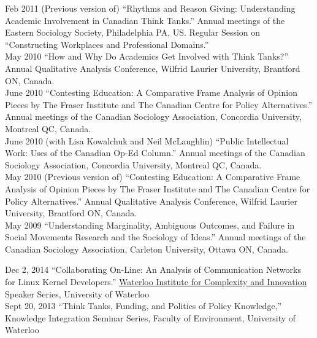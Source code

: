 \documentclass[9pt,usenames,dvipsnames]{article}
\begin{document}
\ind Feb 2011 (Previous version of) ``Rhythms and Reason Giving: Understanding Academic Involvement in Canadian Think Tanks.'' Annual meetings of the Eastern Sociology Society, Philadelphia PA, US. Regular Session on ``Constructing Workplaces and Professional Domains.''\\

\ind May 2010 ``How and Why Do Academics Get Involved with Think Tanks?'' Annual Qualitative Analysis Conference, Wilfrid Laurier University, Brantford ON, Canada.\\

\ind June 2010 ``Contesting Education: A Comparative Frame Analysis of Opinion Pieces by The Fraser Institute and The Canadian Centre for Policy Alternatives.'' Annual meetings  of the Canadian Sociology Association, Concordia University, Montreal QC, Canada.\\

\ind June 2010 (with Lisa Kowalchuk and Neil McLaughlin) ``Public Intellectual Work: Uses of the Canadian Op-Ed Column.'' Annual meetings of the Canadian Sociology Association, Concordia University, Montreal QC, Canada.\\

\ind May 2010 (Previous version of) ``Contesting Education: A Comparative Frame Analysis of Opinion Pieces by The Fraser Institute and The Canadian Centre for Policy Alternatives.'' Annual Qualitative Analysis Conference, Wilfrid Laurier University, Brantford ON, Canada.\\

\ind May 2009 ``Understanding Marginality, Ambiguous Outcomes, and Failure in Social Movements Research and the Sociology of Ideas.'' Annual meetings of the Canadian Sociology Association, Carleton University, Ottawa ON, Canada.\\


\ind Dec 2, 2014 ``Collaborating On-Line: An Analysis of Communication Networks for Linux Kernel Developers.'' \href{http://wici.ca/}{Waterloo Institute for Complexity and Innovation} Speaker Series, University of Waterloo \\


\ind Sept 20, 2013 ``Think Tanks, Funding, and Politics of Policy Knowledge,'' Knowledge Integration Seminar Series, Faculty of Environment, University of Waterloo \\


\end{document}
